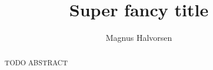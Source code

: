 \documentclass[a4paper]{report}
\title{Super fancy title}
\author{Magnus Halvorsen}
\begin{document}

\setcounter{page}{0}

\begin{abstract}


TODO ABSTRACT

\end{abstract}
\tableofcontents
\listoffigures
\listoftables
\setcounter{page}{0}









%
\end{document}

